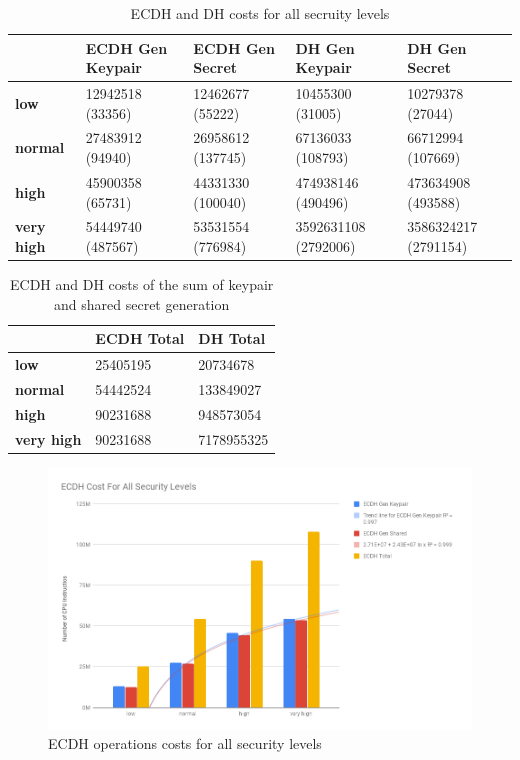 \documentclass{llncs}
\begin{document}
\begin{table}[]
\begin{tabular}{|l|l|l|l|l|}
\hline
                   & \textbf{ECDH Gen Keypair} & \textbf{ECDH Gen Secret} & \textbf{DH Gen Keypair} & \textbf{DH Gen Secret} \\ \hline
\textbf{low}       & 12942518 (33356)          & 12462677 (55222)         & 10455300 (31005)        & 10279378 (27044)       \\ \hline
\textbf{normal}    & 27483912 (94940)          & 26958612 (137745)        & 67136033 (108793)       & 66712994 (107669)      \\ \hline
\textbf{high}      & 45900358 (65731)          & 44331330 (100040)        & 474938146 (490496)      & 473634908 (493588)     \\ \hline
\textbf{very high} & 54449740 (487567)         & 53531554 (776984)        & 3592631108 (2792006)    & 3586324217 (2791154)   \\ \hline
\end{tabular}
\centering \caption{\label{table:ecdh-dh-costs-all-sls} ECDH and DH costs for all secruity levels}
\end{table}

\begin{table}[]
\begin{tabular}{|l|l|l|}
\hline
                   & \textbf{ECDH Total} & \textbf{DH Total} \\ \hline
\textbf{low}       & 25405195            & 20734678          \\ \hline
\textbf{normal}    & 54442524            & 133849027         \\ \hline
\textbf{high}      & 90231688            & 948573054         \\ \hline
\textbf{very high} & 90231688            & 7178955325        \\ \hline
\end{tabular}
\centering \caption{\label{table:ecdh-dh-costs-total-all-sls} ECDH and DH costs of the sum of keypair and shared secret generation}
\end{table}

\begin{figure}
  \centering
  \includegraphics[width=1.0\textwidth]{img/ecdh_cost_all_sls.png}
  \centering \caption{\label{fig:ecdh-costs-all-sls} ECDH operations costs for all security levels}
\end{figure}
\end{document}

